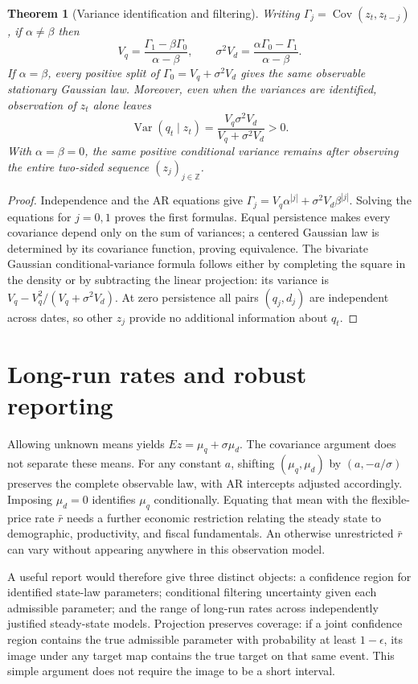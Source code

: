 \documentclass[11pt]{article}
\newtheorem{theorem}{Theorem}
\theoremstyle{definition}
\begin{document}
\begin{theorem}[Variance identification and filtering]
Writing $\Gamma_j=\operatorname{Cov}(z_t,z_{t-j})$, if $\alpha\ne\beta$ then
\[
 V_q=\frac{\Gamma_1-\beta\Gamma_0}{\alpha-\beta},\qquad
 \sigma^2V_d=\frac{\alpha\Gamma_0-\Gamma_1}{\alpha-\beta}.
\]
If $\alpha=\beta$, every positive split of $\Gamma_0=V_q+\sigma^2V_d$ gives the same observable stationary Gaussian law. Moreover, even when the variances are identified, observation of $z_t$ alone leaves
\[
 \operatorname{Var}(q_t\mid z_t)
 =\frac{V_q\sigma^2V_d}{V_q+\sigma^2V_d}>0.
\]
With $\alpha=\beta=0$, the same positive conditional variance remains after observing the entire two-sided sequence $(z_j)_{j\in\mathbb Z}$.
\end{theorem}
\begin{proof}
Independence and the AR equations give $\Gamma_j=V_q\alpha^{|j|}+\sigma^2V_d\beta^{|j|}$. Solving the equations for $j=0,1$ proves the first formulas. Equal persistence makes every covariance depend only on the sum of variances; a centered Gaussian law is determined by its covariance function, proving equivalence. The bivariate Gaussian conditional-variance formula follows either by completing the square in the density or by subtracting the linear projection: its variance is $V_q-V_q^2/(V_q+\sigma^2V_d)$. At zero persistence all pairs $(q_j,d_j)$ are independent across dates, so other $z_j$ provide no additional information about $q_t$.
\end{proof}

\section*{Long-run rates and robust reporting}
Allowing unknown means yields $E z=\mu_q+\sigma\mu_d$. The covariance argument does not separate these means. For any constant $a$, shifting $(\mu_q,\mu_d)$ by $(a,-a/\sigma)$ preserves the complete observable law, with AR intercepts adjusted accordingly. Imposing $\mu_d=0$ identifies $\mu_q$ conditionally. Equating that mean with the flexible-price rate $\bar r$ needs a further economic restriction relating the steady state to demographic, productivity, and fiscal fundamentals. An otherwise unrestricted $\bar r$ can vary without appearing anywhere in this observation model.

A useful report would therefore give three distinct objects: a confidence region for identified state-law parameters; conditional filtering uncertainty given each admissible parameter; and the range of long-run rates across independently justified steady-state models. Projection preserves coverage: if a joint confidence region contains the true admissible parameter with probability at least $1-\epsilon$, its image under any target map contains the true target on that same event. This simple argument does not require the image to be a short interval.
\end{document}
